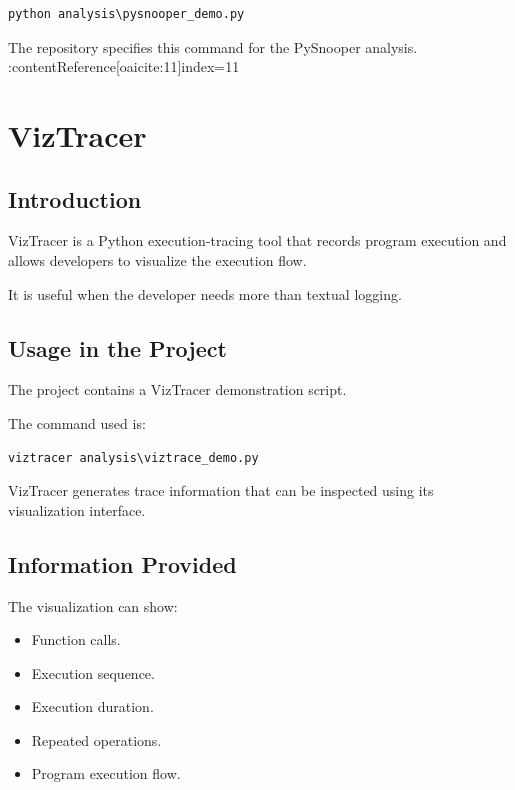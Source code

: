 \documentclass[12pt,a4paper]{report}
\begin{document}
\begin{lstlisting}
python analysis\pysnooper_demo.py
\end{lstlisting}

The repository specifies this command for the PySnooper analysis. :contentReference[oaicite:11]{index=11}


\chapter{VizTracer}

\section{Introduction}

VizTracer is a Python execution-tracing tool that records program
execution and allows developers to visualize the execution flow.

It is useful when the developer needs more than textual logging.

\section{Usage in the Project}

The project contains a VizTracer demonstration script.

The command used is:

\begin{lstlisting}
viztracer analysis\viztrace_demo.py
\end{lstlisting}

VizTracer generates trace information that can be inspected using its
visualization interface.

\section{Information Provided}

The visualization can show:

\begin{itemize}
    \item Function calls.
    \item Execution sequence.
    \item Execution duration.
    \item Repeated operations.
    \item Program execution flow.
\end{itemize}
\end{document}
